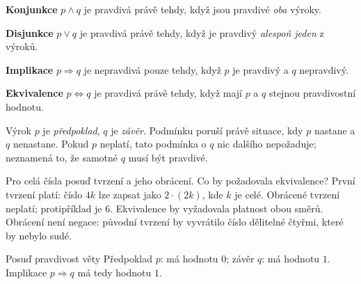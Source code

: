 \documentclass[11pt,a4paper]{article}
\begin{document}
\begin{definiceBox}[title={Definice - Konjunkce}]
\textbf{Konjunkce} $p\land q$ je pravdivá právě tehdy, když jsou pravdivé \emph{oba} výroky.
\end{definiceBox}

\begin{definiceBox}[title={Definice - Disjunkce}]
\textbf{Disjunkce} $p\lor q$ je pravdivá právě tehdy, když je pravdivý \emph{alespoň jeden} z výroků.
\end{definiceBox}

\begin{definiceBox}[title={Definice - Implikace}]
\textbf{Implikace} $p\Rightarrow q$ je nepravdivá pouze tehdy, když $p$ je pravdivý a $q$ nepravdivý.
\end{definiceBox}

\begin{definiceBox}[title={Definice - Ekvivalence}]
\textbf{Ekvivalence} $p\Leftrightarrow q$ je pravdivá právě tehdy, když mají $p$ a $q$ stejnou pravdivostní hodnotu.
\end{definiceBox}


Výrok $p$ je \emph{předpoklad}, $q$ je \emph{závěr}.
Podmínku  poruší právě situace, kdy $p$
nastane a $q$ nenastane. Pokud $p$ neplatí, tato podmínka o $q$
nic dalšího nepožaduje; neznamená to, že samotné $q$ musí být pravdivé.

\begin{prikladReseniBox}[title={Příklad 2}]
Pro celá čísla posuď tvrzení 
a jeho obrácení. Co by požadovala ekvivalence?
\tcblower
První tvrzení platí: číslo $4k$ lze zapsat jako $2\cdot(2k)$, kde
$k$ je celé. Obrácené tvrzení 
neplatí; protipříklad je $6$. Ekvivalence by vyžadovala platnost
obou směrů. Obrácení není negace: původní tvrzení by vyvrátilo
číslo dělitelné čtyřmi, které by nebylo sudé.
\end{prikladReseniBox}

\begin{prikladReseniBox}[title={Příklad 3}]
Posuď pravdivost věty 
\tcblower
Předpoklad $p$:  má hodnotu $0$; závěr $q$:  má hodnotu $1$. Implikace $p\Rightarrow q$ má tedy hodnotu $1$.
\end{prikladReseniBox}
\end{document}
